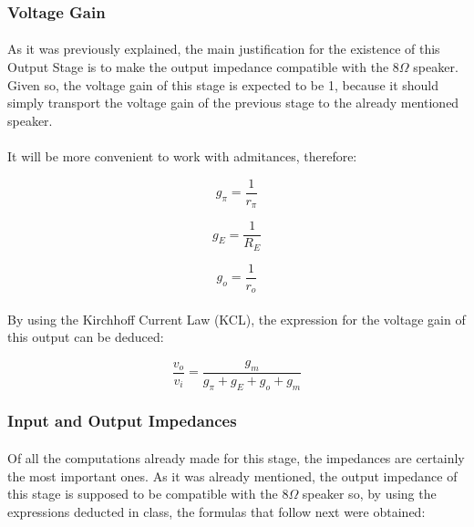 \subsubsection{Voltage Gain}

\paragraph{}As it was previously explained, the main justification for the existence of this Output Stage is to make the output impedance compatible with the $8\Omega$ speaker. Given so, the voltage gain of this stage is expected to be 1, because it should simply transport the voltage gain of the previous stage to the already mentioned speaker.

\paragraph{}It will be more convenient to work with admitances, therefore:

\begin{equation}
    g_\pi=\frac{1}{r_\pi}
\end{equation}

\begin{equation}
    g_E=\frac{1}{R_E}
\end{equation}

\begin{equation}
    g_o=\frac{1}{r_o}
\end{equation}

\paragraph{}By using the Kirchhoff Current Law (KCL), the expression for the voltage gain of this output can be deduced:

\begin{equation}
    \frac{v_o}{v_i}=\frac{g_m}{g_\pi+g_E+g_o+g_m}
\end{equation}



\subsubsection{Input and Output Impedances}

\paragraph{}Of all the computations already made for this stage, the impedances are certainly the most important ones. As it was already mentioned, the output impedance of this stage is supposed to be compatible with the $8\Omega$ speaker so, by using the expressions deducted in class, the formulas that follow next were obtained:

